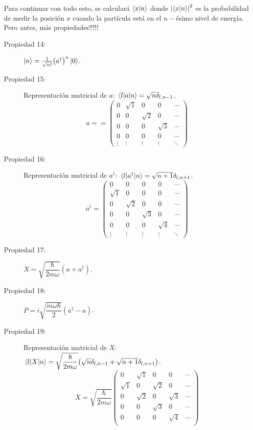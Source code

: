Para continuar con todo esto, se calculará $\braket{x}{n}$ donde $\abs{\braket{x}{n}}^2$ es la probabilidad de medir la posición $x$ cuando la partícula está en el $n-$ésimo nivel de energía. Pero antes, más propiedades!!!!!


\begin{description}
	\item[Propiedad 14: ] $\ket{n} = \frac{1}{\sqrt{n!}} \qty(a^\dagger) ^n \ket{0}$.
	\item[Propiedad 15: ] Representación matricial de $a$: $\mel{l}{a}{n} = \sqrt{n} \delta _{l,n-1}$.
		$$ a = =
\begin{pmatrix}
0 & \sqrt{1} & 0 & 0 & \cdots \\
0 & 0 & \sqrt{2} & 0 & \cdots \\
0 & 0 & 0 & \sqrt{3} & \cdots \\
0 & 0 & 0 & 0 & \cdots \\
\vdots & \vdots & \vdots & \vdots & \ddots
\end{pmatrix} $$
	\item[Propiedad 16: ] Representación matricial de $a^\dagger$: $\mel{l}{a^\dagger}{n} = \sqrt{n + 1} \delta _{l,n+1}$.
		$$ a^\dagger = \begin{pmatrix}
0 & 0 & 0 & 0 & \cdots \\
\sqrt{1} & 0 & 0 & 0 & \cdots \\
0 & \sqrt{2} & 0 & 0 & \cdots \\
0 & 0 & \sqrt{3} & 0 & \cdots \\
0 & 0 & 0 & \sqrt{4} & \cdots \\
\vdots & \vdots & \vdots & \vdots & \ddots
\end{pmatrix} $$
	\item[Propiedad 17: ] $X = \sqrt{\dfrac{\hbar}{2m\omega}} (a + a^\dagger)$.
	\item[Propiedad 18: ] $P = i\sqrt{\dfrac{m\omega \hbar}{2}} (a^\dagger - a)$.
	\item[Propiedad 19: ] Representación matricial de $X$: $\mel{l}{X}{n} = \sqrt{\dfrac{\hbar}{2m\omega}} \qty(\sqrt{n} \delta _{l,n-1} + \sqrt{n+1} \delta _{l,n+1})$.
		$$ X = \sqrt{\frac{\hbar}{2m\omega}}
\begin{pmatrix}
0 & \sqrt{1} & 0 & 0 & \cdots \\
\sqrt{1} & 0 & \sqrt{2} & 0 & \cdots \\
0 & \sqrt{2} & 0 & \sqrt{3} & \cdots \\
0 & 0 & \sqrt{3} & 0 & \cdots \\
0 & 0 & 0 & \sqrt{4} & \cdots \\

\end{pmatrix}$$
\end{description}
